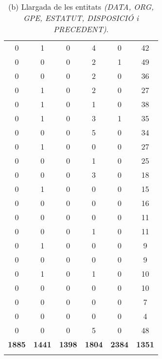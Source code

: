 \begin{table}[H]
\begin{tabular}{cccccc}
    0 & 1 & 0 & 4 & 0 & 42 \\ 
    0 & 0 & 0 & 2 & 1 & 49 \\ 
    0 & 0 & 0 & 2 & 0 & 36 \\ 
    0 & 1 & 0 & 2 & 0 & 27 \\ 
    0 & 1 & 0 & 1 & 0 & 38 \\ 
    0 & 1 & 0 & 3 & 1 & 35 \\ 
    0 & 0 & 0 & 5 & 0 & 34 \\ 
    0 & 1 & 0 & 0 & 0 & 27 \\ 
    0 & 0 & 0 & 1 & 0 & 25 \\ 
    0 & 0 & 0 & 3 & 0 & 18 \\ 
    0 & 1 & 0 & 0 & 0 & 15 \\ 
    0 & 0 & 0 & 0 & 0 & 16 \\ 
    0 & 0 & 0 & 0 & 0 & 11 \\ 
    0 & 0 & 0 & 1 & 0 & 11 \\ 
    0 & 1 & 0 & 0 & 0 & 9 \\ 
    0 & 0 & 0 & 0 & 0 & 9 \\ 
    0 & 1 & 0 & 1 & 0 & 10 \\ 
    0 & 0 & 0 & 0 & 0 & 10 \\ 
    0 & 0 & 0 & 0 & 0 & 7 \\ 
    0 & 0 & 0 & 0 & 0 & 4 \\ 
    0 & 0 & 0 & 5 & 0 & 48 \\ 
    \hline
    \textbf{1885} & \textbf{1441} & \textbf{1398} & \textbf{1804} & \textbf{2384} & \textbf{1351} \\
    \Xhline{2\arrayrulewidth}
    \end{tabular}
    \captionsetup{font=small}
    \caption*{(b) Llargada de les entitats \textit{(DATA, ORG, GPE, ESTATUT, DISPOSICIÓ i PRECEDENT)}.}
\end{table}
  

